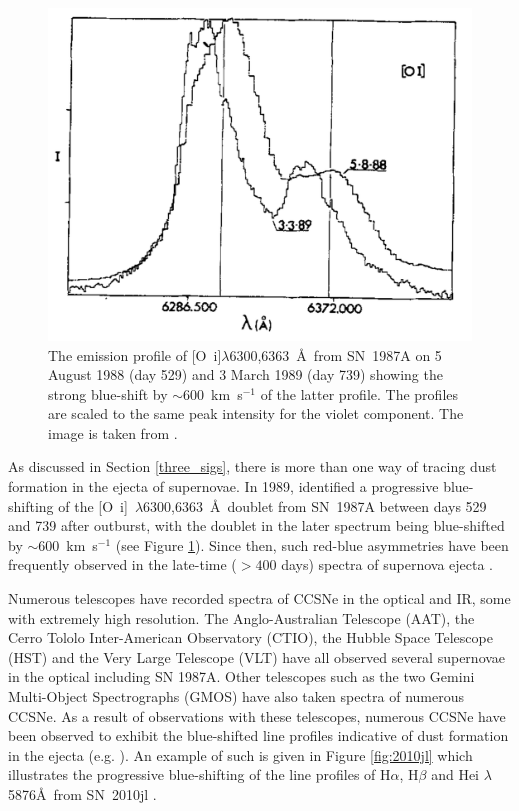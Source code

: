 \begin{figure}
\centering
\includegraphics[clip=true,scale=0.45,trim= 0 0 0 0,angle=1]{chapters/chapter1/figs/LucyOI.png}
\caption{The emission profile of [O~{\sc i}]$\lambda$6300,6363~\AA\ from SN~1987A on 5 August 1988 (day 529) and 3 March 1989 (day 739) showing the strong blue-shift by $\sim 600 $~km~s$^{-1}$ of the latter profile.  The profiles are scaled to the same peak intensity for the violet component.  The image is taken from \citet{Lucy1989}.}
\label{fig:Lucy}
\end{figure}


As discussed in Section \ref{three_sigs}, there is more than one way of tracing dust formation in the ejecta of supernovae.  In 1989, \citeauthor{Lucy1989} identified a progressive blue-shifting of the [O~{\sc i}]~$\lambda$6300,6363~\AA\ doublet from SN~1987A between days 529 and 739 after outburst, with the doublet in the later spectrum being blue-shifted by $\sim 600 $~km~s$^{-1}$ (see Figure \ref{fig:Lucy}). Since then, such red-blue asymmetries have been frequently observed in the late-time ($ > 400$ days) spectra of supernova ejecta  .

Numerous telescopes have recorded spectra of CCSNe in the optical and IR, some with extremely high resolution.  The Anglo-Australian Telescope (AAT), the Cerro Tololo Inter-American Observatory (CTIO), the Hubble Space Telescope (HST) and the Very Large Telescope (VLT) have all observed several supernovae in the optical including SN 1987A.  Other telescopes such as the two Gemini Multi-Object Spectrographs (GMOS) have also taken spectra of numerous CCSNe.  As a result of observations with these telescopes, numerous CCSNe have been observed to exhibit the blue-shifted line profiles indicative of dust formation in the ejecta (e.g. \citet{Lucy1989,Fabbri2011,Mauerhan2012,Milisavljevic2012}).  An example of such is given in Figure \ref{fig:2010jl} which illustrates the progressive blue-shifting of the line profiles of H$\alpha$, H$\beta$ and  He{\sc i} $\lambda$5876\AA\ from SN~2010jl \citep{Gall2014}.


